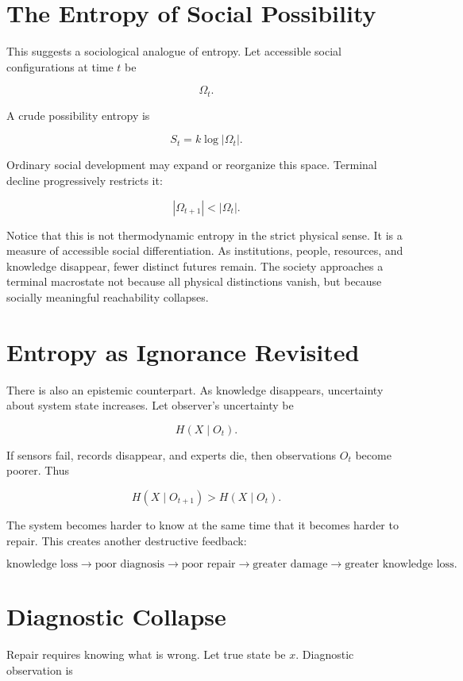 \documentclass[11pt,oneside]{book}
\theoremstyle{definition}
\theoremstyle{remark}
\begin{document}
\section{The Entropy of Social Possibility}

This suggests a sociological analogue of entropy. Let accessible social configurations at time \(t\)
be

\[
\Omega_t.
\]

A crude possibility entropy is

\[
S_t = k\log|\Omega_t|.
\]

Ordinary social development may expand or reorganize this space. Terminal decline progressively
restricts it:

\[
|\Omega_{t+1}|<|\Omega_t|.
\]

Notice that this is not thermodynamic entropy in the strict physical sense. It is a measure of
accessible social differentiation. As institutions, people, resources, and knowledge disappear,
fewer distinct futures remain. The society approaches a terminal macrostate not because all physical
distinctions vanish, but because socially meaningful reachability collapses.

\section{Entropy as Ignorance Revisited}

There is also an epistemic counterpart. As knowledge disappears, uncertainty about system state
increases. Let observer's uncertainty be

\[
H(X\mid O_t).
\]

If sensors fail, records disappear, and experts die, then observations \(O_t\) become poorer. Thus

\[
H(X\mid O_{t+1}) > H(X\mid O_t).
\]

The system becomes harder to know at the same time that it becomes harder to repair. This creates
another destructive feedback:

\[
\text{knowledge loss} \rightarrow \text{poor diagnosis} \rightarrow \text{poor repair} \rightarrow \text{greater damage} \rightarrow \text{greater knowledge loss}.
\]

\section{Diagnostic Collapse}

Repair requires knowing what is wrong. Let true state be \(x\). Diagnostic observation is
\end{document}

